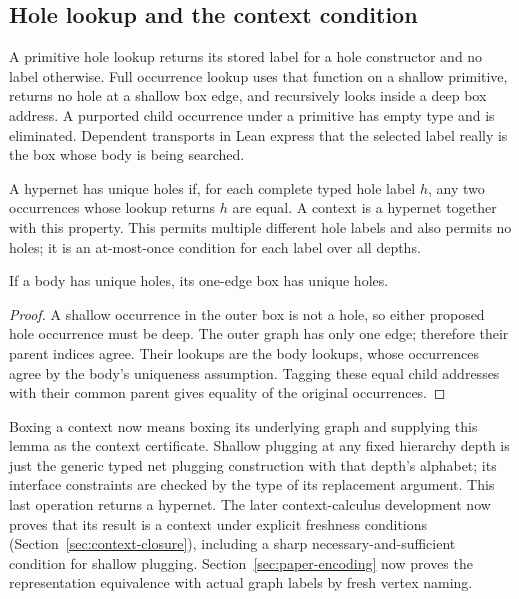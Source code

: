 \subsection{Hole lookup and the context condition}
A primitive hole lookup returns its stored label for a hole constructor and no
label otherwise. Full occurrence lookup uses that function on a shallow primitive,
returns no hole at a shallow box edge, and recursively looks inside a deep box
address. A purported child occurrence under a primitive has empty type and is
eliminated. Dependent transports in Lean express that the selected label really
is the box whose body is being searched.
\begin{definition}\label{term:context}
A hypernet has unique holes if, for each complete typed hole label $h$, any two
occurrences whose lookup returns $h$ are equal. A context is a hypernet together
with this property. This permits multiple different hole labels and also permits
no holes; it is an at-most-once condition for each label over all depths.
\end{definition}
\begin{lemma}
If a body has unique holes, its one-edge box has unique holes.
\end{lemma}
\begin{proof}
A shallow occurrence in the outer box is not a hole, so either proposed hole
occurrence must be deep. The outer graph has only one edge; therefore their
parent indices agree. Their lookups are the body lookups, whose occurrences
agree by the body's uniqueness assumption. Tagging these equal child addresses
with their common parent gives equality of the original occurrences.
\end{proof}
Boxing a context now means boxing its underlying graph and supplying this lemma
as the context certificate. Shallow plugging at any fixed hierarchy depth is
just the generic typed net plugging construction with that depth's alphabet;
its interface constraints are checked by the type of its replacement argument.
This last operation returns a hypernet. The later context-calculus development
now proves that its result is a context under explicit freshness conditions
(Section~\ref{sec:context-closure}), including a sharp necessary-and-sufficient
condition for shallow plugging. Section~\ref{sec:paper-encoding} now proves the representation equivalence
with actual graph labels by fresh vertex naming.

